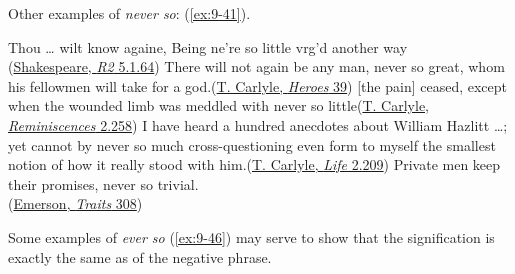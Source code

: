 Other examples of \textit{never so}: (\ref{ex:9-41}).

\ea \label{ex:9-41}
\ea Thou {\dots} wilt know againe, Being ne're so little vrg'd another way\\\hfill(\href{https://internetshakespeare.uvic.ca/doc/R2_F1/scene/5.1/index.html#tln-2320}{Shakespeare, \textit{R2} 5.1.64}) %
\ex There will not again be any man, never so great, whom his fellowmen will take for a god.\hfill(\href{https://archive.org/details/heroesheroworshi00carl/page/38/mode/2up?q=%22there+will+not+again+be%22&view=theater}{T. Carlyle, \textit{Heroes} 39}) %
\ex
{}[the pain] ceased, except when the wounded limb was meddled with never so little\hfill(\href{https://archive.org/details/reminiscences0000thom_e9a0/page/472/mode/2up?q=%22wounded+limb%22&view=theater}{T. Carlyle, \textit{Reminiscences} 2.258}) 
\ex I have heard a hundred anecdotes about William Hazlitt \dots; yet cannot by never so much cross-questioning even form to myself the smallest notion of how it really stood with him.\hfill(\href{https://archive.org/details/thomascarlylehis00frouiala/page/122/mode/2up?view=theater&q=%22hundred+anecdotes%22}{T. Carlyle, \textit{Life} 2.209}) %
\ex Private men keep their promises, never so trivial.\\\hfill(\href{https://quod.lib.umich.edu/e/emerson/4957107.0005.001/132:6.7}{Emerson, \textit{Traits} 308})
\z
\z
{}

Some examples of \textit{ever so} (\ref{ex:9-46}) may serve to show that the signification is exactly the same as of the negative phrase.

